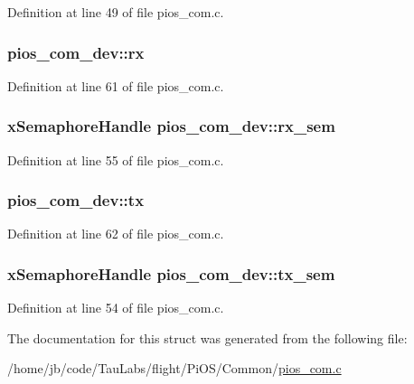 \-Definition at line 49 of file pios\-\_\-com.\-c.

\hypertarget{structpios__com__dev_a505ae5ef4b8b02aa59d47da4275f9c48}{
\subsubsection[{rx}]{ {\bf pios\-\_\-com\-\_\-dev\-::rx}}}\label{structpios__com__dev_a505ae5ef4b8b02aa59d47da4275f9c48}


\-Definition at line 61 of file pios\-\_\-com.\-c.

\hypertarget{structpios__com__dev_a7fc0be64ae4ec8b66c6cc9fb0d14a912}{
\subsubsection[{rx\-\_\-sem}]{\setlength{\rightskip}{0pt plus 5cm}x\-Semaphore\-Handle {\bf pios\-\_\-com\-\_\-dev\-::rx\-\_\-sem}}}\label{structpios__com__dev_a7fc0be64ae4ec8b66c6cc9fb0d14a912}


\-Definition at line 55 of file pios\-\_\-com.\-c.

\hypertarget{structpios__com__dev_a7a373bf857434538304aae2c831929c8}{
\subsubsection[{tx}]{ {\bf pios\-\_\-com\-\_\-dev\-::tx}}}\label{structpios__com__dev_a7a373bf857434538304aae2c831929c8}


\-Definition at line 62 of file pios\-\_\-com.\-c.

\hypertarget{structpios__com__dev_adf20399b709462af4eafca64b6394aa3}{
\subsubsection[{tx\-\_\-sem}]{\setlength{\rightskip}{0pt plus 5cm}x\-Semaphore\-Handle {\bf pios\-\_\-com\-\_\-dev\-::tx\-\_\-sem}}}\label{structpios__com__dev_adf20399b709462af4eafca64b6394aa3}


\-Definition at line 54 of file pios\-\_\-com.\-c.



\-The documentation for this struct was generated from the following file\-:\begin{DoxyCompactItemize}
\item 
/home/jb/code/\-Tau\-Labs/flight/\-Pi\-O\-S/\-Common/\hyperlink{pios__com_8c}{pios\-\_\-com.\-c}\end{DoxyCompactItemize}

